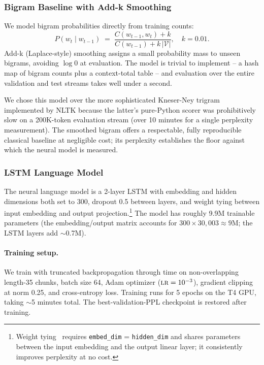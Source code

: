 \documentclass[11pt,a4paper]{article}
\begin{document}
\subsubsection{Bigram Baseline with Add-k Smoothing}

We model bigram probabilities directly from training counts:
\[
P(w_t \mid w_{t-1}) \;=\; \frac{C(w_{t-1}, w_t) + k}{C(w_{t-1}) + k\,|\mathcal{V}|},
\quad k=0.01.
\]
Add-k (Laplace-style) smoothing assigns a small probability mass to
unseen bigrams, avoiding $\log 0$ at evaluation. The model is trivial
to implement -- a hash map of bigram counts plus a context-total
table -- and evaluation over the entire validation and test streams
takes well under a second.

We chose this model over the more sophisticated Kneser-Ney trigram
implemented by NLTK because the latter's pure-Python scorer was
prohibitively slow on a 200K-token evaluation stream (over 10 minutes
for a single perplexity measurement). The smoothed bigram offers a
respectable, fully reproducible classical baseline at negligible cost;
its perplexity establishes the floor against which the neural model is
measured.

\subsubsection{LSTM Language Model}

The neural language model is a 2-layer LSTM with embedding and hidden
dimensions both set to 300, dropout 0.5 between layers, and weight
tying between input embedding and output projection.\footnote{Weight
tying~\cite{press2017tying} requires \texttt{embed\_dim} = \texttt{hidden\_dim}
and shares parameters between the input embedding and the output linear
layer; it consistently improves perplexity at no cost.} The model has
roughly 9.9M trainable parameters (the embedding/output matrix accounts
for $300 \times 30{,}003 \approx 9$M; the LSTM layers add $\sim$0.7M).

\paragraph{Training setup.} We train with truncated backpropagation
through time on non-overlapping length-35 chunks, batch size 64, Adam
optimizer ($\textsc{lr}=10^{-3}$), gradient clipping at norm 0.25, and
cross-entropy loss. Training runs for 5 epochs on the T4 GPU, taking
$\sim$5 minutes total. The best-validation-PPL checkpoint is restored
after training.
\end{document}
